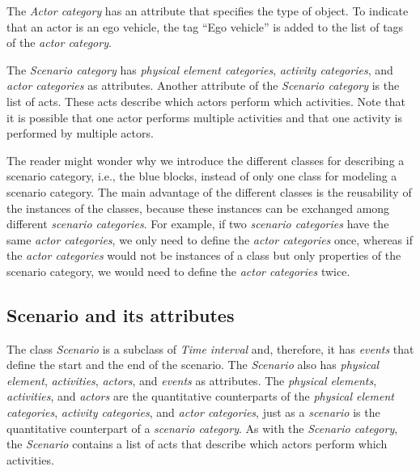 The \textit{Actor category} has an attribute that specifies the type of object.
To indicate that an actor is an ego vehicle, the tag ``Ego vehicle'' is added to the list of tags of the \textit{actor category}.

The \textit{Scenario category} has \cstarte \textit{physical element categories}\cende, \textit{activity categories}, and \textit{actor categories} as attributes. 
Another attribute of the \textit{Scenario category} is the list of acts. %
These acts describe which actors perform which activities. Note that it is possible that one actor performs multiple activities and that one activity is performed by multiple actors.

The reader might wonder why we introduce the different classes for describing a scenario category, i.e., the blue blocks, instead of only one class for modeling a scenario category. 
The main advantage of the different classes is the reusability of the instances of the classes, because these instances can be exchanged among different \textit{scenario categories}. For example, if two \textit{scenario categories} have the same \textit{actor categories}, we only need to define the \textit{actor categories} once, whereas if the \textit{actor categories} would not be instances of a class but only properties of the scenario category, we would need to define the \textit{actor categories} twice.



\subsection{Scenario and its attributes}
\label{sec:domain scenario}

\cstartb The class \textit{Scenario} is a subclass of \textit{Time interval} and, therefore, it has \textit{events} that define the start and the end of the scenario. \cendb
The \textit{Scenario} also has \cstarte\textit{physical element}\cende, \textit{activities}, \textit{actors}, and \textit{events} as attributes. 
The \cstarte\textit{physical elements}\cende, \textit{activities}, and \textit{actors} are the quantitative counterparts of the \cstarte\textit{physical element categories}\cende, \textit{activity categories}, \cendb and \textit{actor categories}, just as a \textit{scenario} is the quantitative counterpart of a \textit{scenario category}. 
As with the \textit{Scenario category}, the \textit{Scenario} contains a list of acts that describe which actors perform which activities.

